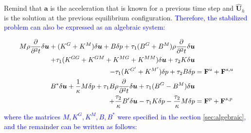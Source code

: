\documentclass[11pt,english]{article}
\newcommand{\LM}[1]{\textcolor{blue}{#1}}
\def\UnkVariables{\boldsymbol{U}}
\def\a{\boldsymbol{a}}
\begin{document}
Remind that $\a$ is the acceleration that is known for a previous time step and $\hat{\UnkVariables}_h$ is the solution at the previous equilibrium configuration. \LM{Therefore, the stabilized problem can also be expressed as an algebraic system:}

\begin{align}
    M \rho \dfrac{\partial}{\partial^2 t} \delta \boldsymbol{u} + (K^G+K^M) \delta \boldsymbol{u} + B \delta p + \tau_1 (B^G+B^M) \rho \dfrac{\partial}{\partial^2 t}\delta \boldsymbol{u}  &\\ 
    \nonumber +\tau_1 (K^{GG}+K^{GM}+K^{MG}+K^{MM})\delta \boldsymbol{u}  + \tau_2 K \delta \boldsymbol{u}   &\\
    \nonumber - \tau_1(K^{G'}+K^{M'}) \delta p + \tau_2 B \delta p &= \boldsymbol{\rm{F}}^{u}+ \boldsymbol{\rm{F}}^{s,u} \\
     B^{*}\delta \boldsymbol{u} + \dfrac{1}{\kappa} M \delta p + \tau_1 B \rho \dfrac{\partial}{\partial^2 t} \delta \boldsymbol{u} + \tau_1 (B^G - B^M) \delta \boldsymbol{u} &\\
     \nonumber + \dfrac{\tau_2}{\kappa}B' \delta \boldsymbol{u} - \tau_1 K \delta p - \dfrac{\tau_2}{\kappa} M \delta p & = \boldsymbol{\rm{F}}^{p}+\boldsymbol{\rm{F}}^{s,p}
\end{align}
\LM{where the matrices $M, K^G, K^M, B, B^*$ were specified in the section \ref{sec:algebraic}, and the remainder can be written as follows:}
\end{document}
